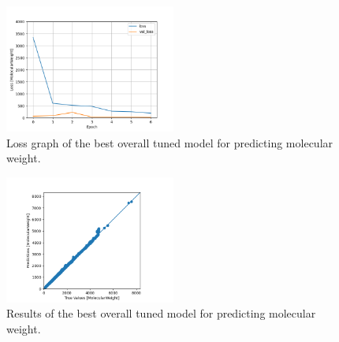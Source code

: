     \begin{figure}
        \centering
        \includegraphics[width=0.5\textwidth]{model_20_7_epochs_loss_MolecularWeight.png}
        \caption{Loss graph of the best overall tuned model for predicting molecular weight.}
        \label{fig:model20-mol-weight-loss}
    \end{figure}
    \begin{figure}
        \centering
        \includegraphics[width=0.5\textwidth]{model_20_7_epochs_predictions_MolecularWeight.png}
        \caption{Results of the best overall tuned model for predicting molecular weight.}
        \label{fig:model20-mol-weight-predictions}
    \end{figure}
    
